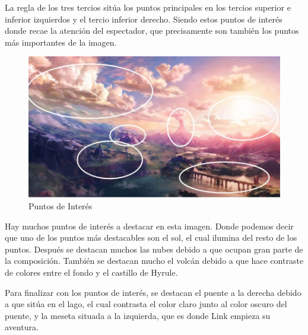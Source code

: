 \documentclass[12pt]{article}
\begin{document}
          La regla de los tres tercios sitúa los puntos principales en los tercios superior e inferior izquierdos y el tercio inferior derecho. 
          Siendo estos puntos de interés donde recae la atención del espectador, que precisamente son también los puntos más importantes de la imagen.
          \newpage
          \begin{figure}[H]
            \centering
            \includegraphics[width=\textwidth]{images/Jesus/Seccion2/Group 5.JPEG}
            \caption{\small {Puntos de Interés}}
          \end{figure}
          Hay muchos puntos de interés a destacar en esta imagen. Donde podemos decir que uno de los puntos más destacables son el sol, el cual ilumina del resto de los puntos.
          Después se destacan muchos las nubes debido a que ocupan gran parte de la composición. 
          También se destacan mucho el volcán debido a que hace contraste de colores entre el fondo y el castillo de Hyrule. 

          Para finalizar con los puntos de interés, se destacan el puente a la derecha debido a que sitúa en el lago, el cual contrasta el color claro junto al color oscuro del puente, y la meseta situada a la izquierda, que es donde Link empieza su aventura.
          
\end{document}
